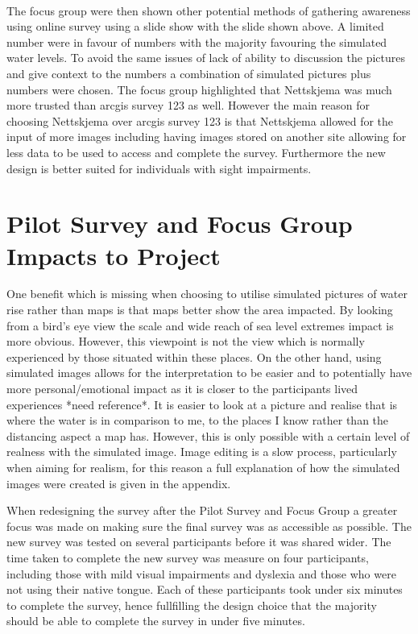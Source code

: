\paragraph{}
The focus group were then shown other potential methods of gathering awareness using online survey using a slide show with the slide shown above. A limited number were in favour of numbers with the majority favouring the simulated water levels. To avoid the same issues of lack of ability to discussion the pictures and give context to the numbers a combination of simulated pictures plus numbers were chosen. 
The focus group highlighted that Nettskjema was much more trusted than arcgis survey 123 as well. However the main reason for choosing Nettskjema over arcgis survey 123 is that Nettskjema allowed for the input of more images including having images stored on another site allowing for less data to be used to access and complete the survey. Furthermore the new design is better suited for individuals with sight impairments.   

\section{Pilot Survey and Focus Group Impacts to Project}
One benefit which is missing when choosing to utilise simulated pictures of water rise rather than maps is that maps better show the area impacted. By looking from a bird’s eye view the scale and wide reach of sea level extremes impact is more obvious. However, this viewpoint is not the view which is normally experienced by those situated within these places. On the other hand, using simulated images allows for the interpretation to be easier and to potentially have more personal/emotional impact as it is closer to the participants lived experiences *need reference*. It is easier to look at a picture and realise that is where the water is in comparison to me, to the places I know rather than the distancing aspect a map has. However, this is only possible with a certain level of realness with the simulated image. Image editing is a slow process, particularly when aiming for realism, for this reason a full explanation of how the simulated images were created is given  in the appendix. 

When redesigning the survey after the Pilot Survey and Focus Group a greater focus was made on making sure the final survey was as accessible as possible. The new survey was tested on several participants before it was shared wider. The time taken to complete the new survey was measure on four participants, including those with mild visual impairments and dyslexia and those who were not using their native tongue. Each of these participants took under six minutes to complete the survey, hence fullfilling the design choice that the majority should be able to complete the survey in under five minutes. 


